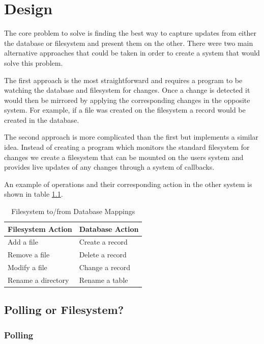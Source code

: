 \chapter{Design}

The core problem to solve is finding the best way to capture updates from
either the database or filesystem and present them on the other. There were two
main alternative approaches that could be taken in order to create a system
that would solve this problem.

The first approach is the most straightforward and requires a program to be
watching the database and filesystem for changes. Once a change is detected it
would then be mirrored by applying the corresponding changes in the opposite
system. For example, if a file was created on the filesystem a record would be
created in the database.

The second approach is more complicated than the first but implements a similar
idea. Instead of creating a program which monitors the standard filesystem for
changes we create a filesystem that can be mounted on the users system and
provides live updates of any changes through a system of callbacks.

An example of operations and their corresponding action in the other system is
shown in table \ref{tbl:mappings}.

\begin{table}
	\centering
	\begin{tabular}{|l|l|}
		\hline
		\textbf{Filesystem Action} & \textbf{Database Action} \\
		\hline
		Add a file & Create a record \\
		Remove a file & Delete a record \\
		Modify a file & Change a record \\
		Rename a directory & Rename a table \\
		\hline
	\end{tabular}
	\caption{Filesystem to/from Database Mappings}
	\label{tbl:mappings}
\end{table}

\section{Polling or Filesystem?}

\subsection{Polling}

